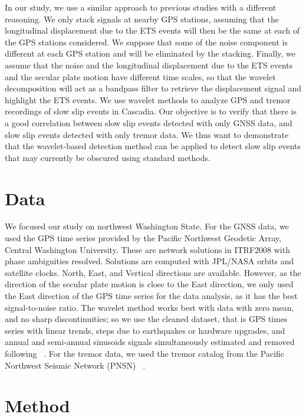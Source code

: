 \documentclass{article}
\begin{document}
In our study, we use a similar approach to previous studies with a different reasoning. We only stack signals at nearby GPS stations, assuming that the longitudinal displacement due to the ETS events will then be the same at each of the GPS stations considered. We suppose that some of the noise component is different at each GPS station and will be eliminated by the stacking. Finally, we assume that the noise and the longitudinal displacement due to the ETS events and the secular plate motion have different time scales, so that the wavelet decomposition will act as a bandpass filter to retrieve the displacement signal and highlight the ETS events. We use wavelet methods to analyze GPS and tremor recordings of slow slip events in Cascadia. Our objective is to verify that there is a good correlation between slow slip events detected with only GNSS data, and slow slip events detected with only tremor data. We thus want to demonstrate that the wavelet-based detection method can be applied to detect slow slip events that may currently be obscured using standard methods. \\

\section{Data}

We focused our study on northwest Washington State. For the GNSS data, we used the GPS time series provided by the Pacific Northwest Geodetic Array, Central Washington University. These are network solutions in ITRF2008 with phase ambiguities resolved. Solutions are computed with JPL/NASA orbits and satellite clocks. North, East, and Vertical directions are available. However, as the direction of the secular plate motion is close to the East direction, we only used the East direction of the GPS time series for the data analysis, as it has the best signal-to-noise ratio. The wavelet method works best with data with zero mean, and no sharp discontinuities; so we use the cleaned dataset, that is GPS times series with linear trends, steps due to earthquakes or hardware upgrades, and annual and semi-annual sinusoids signals simultaneously estimated and removed following ~\citet{SZE_2004}. For the tremor data, we used the tremor catalog from the Pacific Northwest Seismic Network (PNSN) ~\citep{WEC_2010}. \\

\section{Method} 
\end{document}
